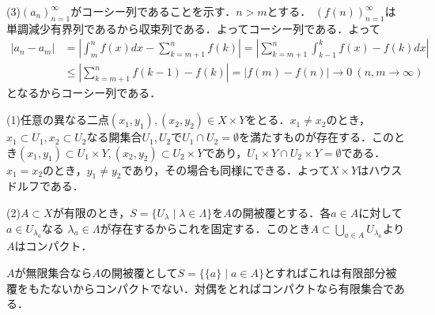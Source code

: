 \documentclass[
		book,
		head_space=20mm,
		foot_space=20mm,
		gutter=10mm,
		line_length=190mm
]{jlreq}
\begin{document}
(3)$(a_n)_{n=1}^{\infty}$がコーシー列であることを示す．$n>m$とする．
$(f(n))_{n=1}^{\infty}$は単調減少有界列であるから収束列である．よってコーシー列である．よって
\begin{align}
    |a_n-a_m|&=\left| \int_{m}^{n} f(x)dx-\sum\limits_{k=m+1}^n f(k)\right| =\left| \sum\limits_{k=m+1}^n \int_{k-1}^{k} f(x)-f(k)dx\right|\\
    &\le \left| \sum\limits_{k=m+1}^n f(k-1)-f(k)\right|=|f(m)-f(n)| \rightarrow 0 \ (n,m \rightarrow \infty)
\end{align}
となるからコーシー列である．

(1)任意の異なる二点$(x_1,y_1),(x_2,y_2) \in X \times Y$をとる．$x_1 \neq x_2$のとき，$x_1 \subset U_1 ,x_2 \subset U_2$なる開集合$U_1,U_2$で$U_1 \cap U_2=\emptyset$を満たすものが存在する．このとき$(x_1,y_1)\subset U_1 \times Y,(x_2,y_2) \subset U_2 \times Y$であり，$U_1 \times Y \cap U_2 \times Y=\emptyset$である．$x_1=x_2$のとき，$y_1 \neq y_2$であり，その場合も同様にできる．よって$X \times Y$はハウスドルフである．

(2)$A \subset X$が有限のとき，$S=\{ U_\lambda\mid \lambda\in \Lambda\}$を$A$の開被覆とする．各$a \in A$に対して$a \in U_{\lambda_a}$なる $ \lambda_a \in \Lambda$が存在するからこれを固定する．このとき$A \subset \bigcup\limits_{a \in A }U_{\lambda_a}$より$A$はコンパクト．

$A$が無限集合なら$A$の開被覆として$S=\{ \{a\} \mid a \in A\}$とすればこれは有限部分被覆をもたないからコンパクトでない．対偶をとればコンパクトなら有限集合である．
\end{document}
